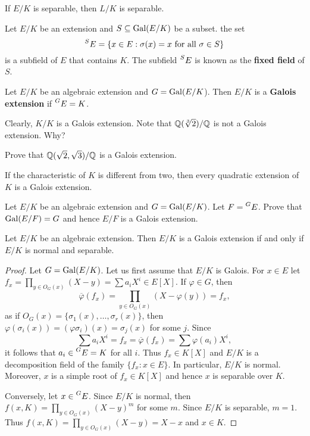 \begin{exercise}
If $E/K$ is separable, then $L/K$ is separable.
\end{exercise}

Let $E/K$ be an extension and $S\subseteq\operatorname{Gal}(E/K)$ be a subset. 
the set 
\[
    \prescript{S}{}{E}=\{x\in E:\sigma(x)=x\text{ for all $\sigma\in S$}\}
\]
is a subfield of $E$ that contains $K$. The subfield $\prescript{S}{}{E}$
is known as the \textbf{fixed field} of $S$. 

\begin{definition}
    Let $E/K$ be an algebraic extension and $G=\operatorname{Gal}(E/K$). 
    Then $E/K$ is a \textbf{Galois extension} if $\prescript{G}{}{E}=K$. 
\end{definition}

Clearly, $K/K$ is a Galois extension. 
Note that $\mathbb{Q}(\sqrt[3]{2})/\mathbb{Q}$ is not a Galois extension. Why?

\begin{exercise}
    Prove that $\mathbb{Q}(\sqrt{2},\sqrt{3})/\mathbb{Q}$ is a Galois extension. 
\end{exercise}

\begin{exercise}
If the characteristic of $K$ is different from two, 
then every quadratic extension of $K$ is a Galois extension. 
\end{exercise}

\begin{exercise}
    Let $E/K$ be an algebraic extension and $G=\operatorname{Gal}(E/K)$. Let
    $F=\prescript{G}{}{E}$. Prove that $\operatorname{Gal}(E/F)=G$ and hence $E/F$ is a Galois extension. 
\end{exercise}

\begin{proposition}
\label{pro:normal+separable}
    Let $E/K$ be an algebraic extension. Then $E/K$ is a Galois extension
    if and only if $E/K$ is normal and separable. 
\end{proposition}

\begin{proof}
    Let $G=\operatorname{Gal}(E/K)$. Let us first assume that $E/K$ is Galois. For $x\in E$ let 
    $f_x=\prod_{y\in O_G(x)}(X-y)=\sum a_iX^i\in E[X]$. If $\varphi\in G$, then 
    \[
    \overline{\varphi}(f_x)=\prod_{y\in O_G(x)}(X-\varphi(y))=f_x,
    \]
    as if $O_G(x)=\{\sigma_1(x),\dots,\sigma_r(x)\}$, then 
    $\varphi(\sigma_i(x))=(\varphi\sigma_i)(x)=\sigma_j(x)$ for some $j$. 
    Since 
    \[
    \sum a_iX^i=f_x=\overline{\varphi}(f_x)=\sum\varphi(a_i)X^i,
    \]
    it follows that $a_i\in\prescript{G}{}{E}=K$ for all $i$. 
    Thus $f_x\in K[X]$
    and $E/K$ is a decomposition field of the family $\{f_x:x\in E\}$. In particular, 
    $E/K$ is normal. Moreover, $x$ is a simple root of $f_x\in K[X]$ and hence
    $x$ is separable over $K$. 

    Conversely, let $x\in \prescript{G}{}{E}$. Since $E/K$ is normal, then 
    $f(x,K)=\prod_{y\in O_G(x)}(X-y)^m$ for some $m$. Since $E/K$ is separable, 
    $m=1$. Thus $f(x,K)=\prod_{y\in O_G(x)}(X-y)=X-x$ and $x\in K$. 
\end{proof}

